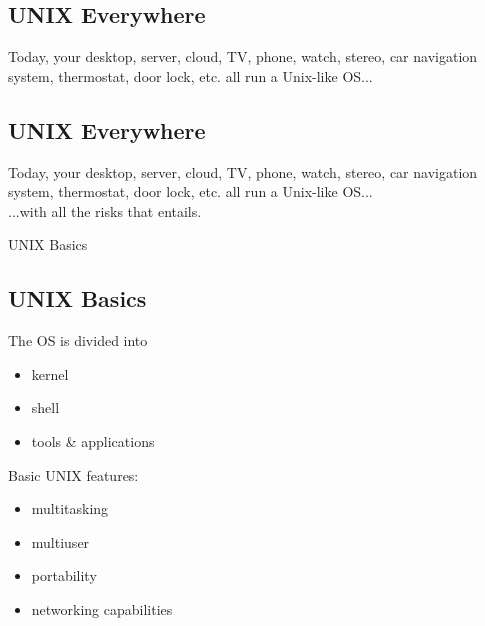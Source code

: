 \documentclass[xga]{xdvislides}
\begin{document}
\subsection{UNIX Everywhere}
\Hugesize
\vspace*{\fill}
\begin{center}
Today, your desktop, server, cloud, TV, phone, watch, stereo, car
navigation system, thermostat, door lock, etc. all run a Unix-like OS... \\
\end{center}
\vspace*{\fill}
\Normalsize

\subsection{UNIX Everywhere}
\Hugesize
\vspace*{\fill}
\begin{center}
Today, your desktop, server, cloud, TV, phone, watch, stereo, car
navigation system, thermostat, door lock, etc. all run a Unix-like OS... \\
\vspace{.5in}
...with all the risks that entails.
\end{center}
\vspace*{\fill}
\Normalsize

\pagebreak

\vspace*{\fill}
\begin{center}
  \Hugesize
    UNIX Basics
	\hspace*{5mm}\blueline\\ [1em]
  \Normalsize
\end{center}
\vspace*{\fill}

\subsection{UNIX Basics}
The OS is divided into
\begin{itemize}
	\item kernel
	\item shell
	\item tools \& applications
\end{itemize}
\addvspace{.5in}
Basic UNIX features:
\begin{itemize}
	\item multitasking
	\item multiuser
	\item portability
	\item networking capabilities
\end{itemize}
\end{document}
